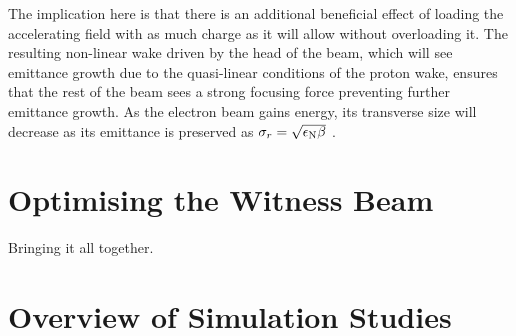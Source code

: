 The implication here is that there is an additional beneficial effect of loading the accelerating field with as much charge as it will allow without overloading it. The resulting non-linear wake driven by the head of the beam, which will see emittance growth due to the quasi-linear conditions of the proton wake, ensures that the rest of the beam sees a strong focusing force preventing further emittance growth. As the electron beam gains energy, its transverse size will decrease as its emittance is preserved as $\sigma_{r} = \sqrt{\epsilon_{\mathrm{N}}\beta}$ \cite{wille:2001}.


\section{Optimising the Witness Beam}
\label{Sim:Opt}

Bringing it all together.


\section{Overview of Simulation Studies}
\label{Sim:Summary}

